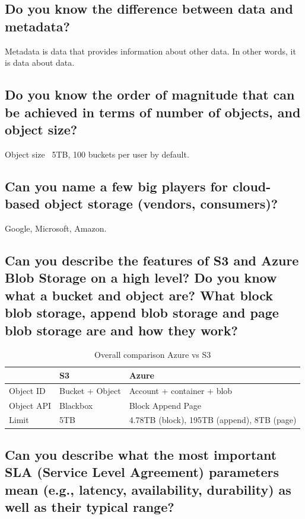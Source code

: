 \documentclass{article}
\begin{document}
\pagebreak

\subsection{Do you know the difference between data and metadata?}

Metadata is data that provides information about other data. In other words, it is data about data.

\subsection{Do you know the order of magnitude that can be achieved in terms of number of objects, and object size?}

Object size ~5TB, 100 buckets per user by default.

\subsection{Can you name a few big players for cloud-based object storage (vendors, consumers)?}

Google, Microsoft, Amazon.

\subsection{Can you describe the features of S3 and Azure Blob Storage on a high level? Do you know what a bucket and object are? What block blob storage, append blob storage and page blob storage are and how they work?}

\begin{table}
  \centering
  \begin{tabular}{lll}
    \toprule
    & S3 & Azure \\
    \midrule
    Object ID & Bucket + Object & Account + container + blob \\
    Object API & Blackbox & Block Append Page \\
    Limit & 5TB & 4.78TB (block), 195TB (append), 8TB (page)\\
    \bottomrule
  \end{tabular}
  \caption{Overall comparison Azure vs S3}
  \label{tab:azurevss3}
\end{table}


\subsection{Can you describe what the most important SLA (Service Level Agreement) parameters mean (e.g., latency, availability, durability) as well as their typical range?}
\end{document}
